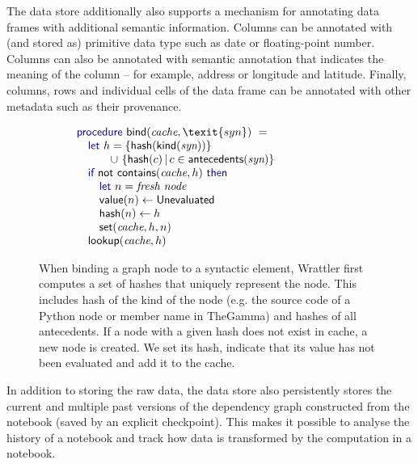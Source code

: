\documentclass[sigplan]{acmart}\settopmatter{printfolios=true,printccs=false,printacmref=false}
\begin{document}
The data store additionally also supports a mechanism for annotating data frames with additional 
semantic information. Columns can be annotated with (and stored as) primitive data type such as 
date or floating-point number. Columns can also be annotated with semantic annotation that indicates
the meaning of the column -- for example, address or longitude and latitude. Finally, columns,
rows and individual cells of the data frame can be annotated with other metadata such as their
provenance.

\begin{figure}
\vspace{-1em}
\begin{equation*}
\hspace{-6em}\begin{array}{l}
\kvd{procedure}~\ident{bind}(\textit{cache}, \texit{syn})~=\\
\quad \kvd{let}~h = \{ \ident{hash}(\ident{kind}(\textit{syn})) \} \\  
\quad \qquad \cup~ \{\ident{hash}(c) \,|\, c\in\ident{antecedents}(\textit{syn}) \}\\
\quad \kvd{if}~\ident{not}~\ident{contains}(\textit{cache}, h)~\kvd{then}\\
\quad \quad \kvd{let}~n = \emph{fresh node}\\
\quad \quad \ident{value}(n) \leftarrow \ident{Unevaluated} \\
\quad \quad \ident{hash}(n) \leftarrow h\\
\quad \quad \ident{set}(\textit{cache}, h, n) \\
\quad \ident{lookup}(\textit{cache}, h)\\
\end{array}
\end{equation*}
\vspace{-0.5em}
\caption{\small{When binding a graph node to a syntactic element, Wrattler first computes
  a set of hashes that uniquely represent the node. This includes hash of the kind of the 
  node (e.g. the source code of a Python node or member name in TheGamma) and hashes
  of all antecedents. If a node with a given hash does not exist in cache, a new node
  is created. We set its hash, indicate that its value has not been evaluated and
  add it to the cache.}}
\label{fig:bind}
\end{figure}

In addition to storing the raw data, the data store also persistently stores the current and
multiple past versions of the dependency graph constructed from the notebook (saved by an 
explicit checkpoint). This makes it possible to analyse the history of a notebook and track how
data is transformed by the computation in a notebook.
\end{document}
